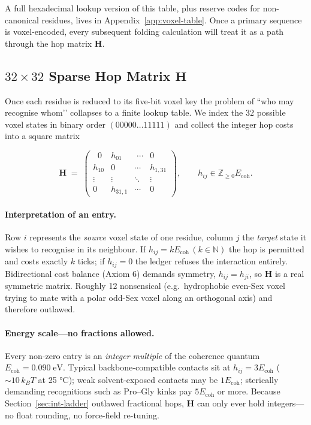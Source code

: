 \documentclass[11pt]{article}
\newcommand{\Eoh}{E_{\mathrm{coh}}}          %
\begin{document}
A full hexadecimal lookup version of this table, plus reserve codes for
non-canonical residues, lives in Appendix~\ref{app:voxel-table}.  Once a
primary sequence is voxel-encoded, every subsequent folding calculation
will treat it as a path through the hop matrix \(\mathbf H\).

\subsection{\texorpdfstring{$32\times32$}{32x32} Sparse Hop Matrix \texorpdfstring{$\mathbf H$}{H}}
\label{sec:hop-matrix}

Once each residue is reduced to its five-bit voxel key the problem of
``who may recognise whom’’ collapses to a finite lookup table.  We index
the \(32\) possible voxel states in binary order \((00000\ldots11111)\)
and collect the integer hop costs into a square matrix

\[
\mathbf H\;=\;
\begin{pmatrix}
\;\;0 & h_{01} & \;\cdots & 0\\
h_{10} & 0 & \cdots & h_{1,31}\\
\vdots & \vdots & \ddots & \vdots\\
0 & h_{31,1} & \cdots & 0
\end{pmatrix},
\qquad
h_{ij}\in\mathbb Z_{\ge 0}\Eoh.
\]

\paragraph{Interpretation of an entry.}
Row \(i\) represents the \emph{source} voxel state of one residue, column
\(j\) the \emph{target} state it wishes to recognise in its neighbour.
If \(h_{ij}=k\Eoh\,(k\in\mathbb N)\) the hop is permitted and costs
exactly \(k\) ticks; if \(h_{ij}=0\) the ledger refuses the interaction
entirely.  Bidirectional cost balance (Axiom 6) demands symmetry,
\(h_{ij}=h_{ji}\), so \(\mathbf H\) is a real symmetric matrix.  Roughly
12 %
nonsensical (e.g.\ hydrophobic even-Sex voxel trying to mate with a
polar odd-Sex voxel along an orthogonal axis) and therefore outlawed.

\paragraph{Energy scale—no fractions allowed.}
Every non-zero entry is an \emph{integer multiple} of the coherence
quantum \(\Eoh=0.090\;\text{eV}\).  Typical backbone‐compatible contacts
sit at \(h_{ij}=3\Eoh\) (\(\sim10\,k_{B}T\) at 25 °C); weak solvent-exposed
contacts may be \(1\Eoh\); sterically demanding recognitions such as
Pro–Gly kinks pay \(5\Eoh\) or more.  Because
Section~\ref{sec:int-ladder} outlawed fractional hops, \(\mathbf H\) can
only ever hold integers—no float rounding, no force-field re-tuning.
\end{document}

